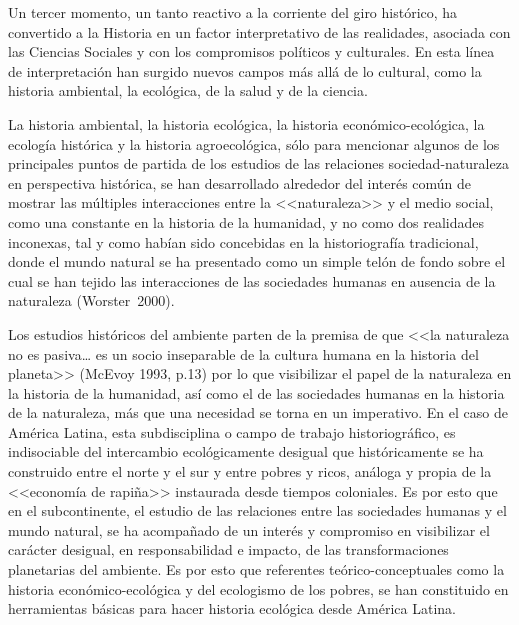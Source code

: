 Un tercer momento, un tanto reactivo a la corriente del giro histórico, ha
convertido a la Historia en un factor interpretativo de las realidades,
asociada con las Ciencias Sociales y con los compromisos políticos y
culturales. En esta línea de interpretación han surgido nuevos campos más
allá de lo cultural, como la historia ambiental, la ecológica, de la salud
y de la ciencia.

\enlargethispage{1\baselineskip}
La historia ambiental, la historia ecológica, la historia
eco\-nó\-mi\-co-eco\-ló\-gi\-ca, la ecología histórica y la historia agroecológica,
sólo para mencionar algunos de los principales puntos de partida de los
estudios de las relaciones sociedad-naturaleza en perspectiva histórica, se
han desarrollado alrededor del interés común de mostrar las múltiples
interacciones entre la <<naturaleza>> y el medio social, como una constante
en la historia de la humanidad, y no como dos realidades inconexas, tal y
como habían sido concebidas en la historiografía tradicional, donde el
mundo natural se ha presentado como un simple telón de fondo sobre el cual
se han tejido las interacciones de las sociedades humanas en ausencia de la
naturaleza (Worster~2000).

Los estudios históricos del ambiente parten de la premisa de que <<la
naturaleza no es pasiva\ldots{} es un socio inseparable de la cultura humana en la
historia del planeta>> (McEvoy 1993, p.13) por lo que
visibilizar el papel de la naturaleza en la historia de la humanidad, así
como el de las sociedades humanas en la historia de la naturaleza, más que
una necesidad se torna en un imperativo. En el caso de América Latina, esta
subdisciplina o campo de trabajo historiográfico, es indisociable del
intercambio ecológicamente desigual que históricamente se ha construido
entre el norte y el sur y entre pobres y ricos, análoga y propia de la
<<economía de rapiña>> instaurada desde tiempos coloniales. Es por esto que
en el subcontinente, el estudio de las relaciones entre las sociedades
humanas y el mundo natural, se ha acompañado de un interés y compromiso en
visibilizar el carácter desigual, en responsabilidad e impacto, de las
transformaciones planetarias del ambiente. Es por esto que referentes
teórico-conceptuales como la historia económico-ecológica y del ecologismo
de los pobres, se han constituido en herramientas básicas para hacer
historia ecológica desde América Latina.

